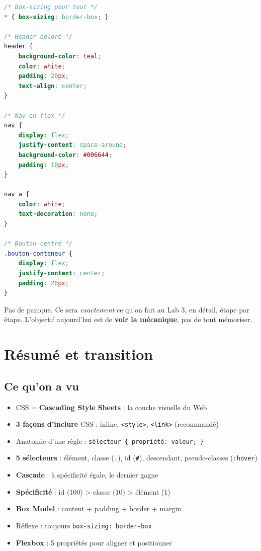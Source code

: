 \documentclass[11pt,a4paper]{article}
\begin{document}
\begin{lstlisting}[language=CSS]
/* Box-sizing pour tout */
* { box-sizing: border-box; }

/* Header coloré */
header {
    background-color: teal;
    color: white;
    padding: 20px;
    text-align: center;
}

/* Nav en flex */
nav {
    display: flex;
    justify-content: space-around;
    background-color: #006644;
    padding: 10px;
}

nav a {
    color: white;
    text-decoration: none;
}

/* Bouton centré */
.bouton-conteneur {
    display: flex;
    justify-content: center;
    padding: 20px;
}
\end{lstlisting}

\begin{infobox}
Pas de panique. Ce sera \emph{exactement} ce qu'on fait au Lab 3, en
détail, étape par étape. L'objectif aujourd'hui est de \textbf{voir la
mécanique}, pas de tout mémoriser.
\end{infobox}

\newpage

\section{Résumé et transition}

\subsection{Ce qu'on a vu}

\begin{itemize}[leftmargin=*,nosep]
    \item CSS = \textbf{Cascading Style Sheets} : la couche visuelle du Web
    \item \textbf{3 façons d'inclure} CSS : inline, \texttt{<style>}, \texttt{<link>} (recommandé)
    \item Anatomie d'une règle : \texttt{sélecteur \{ propriété: valeur; \}}
    \item \textbf{5 sélecteurs} : élément, classe (\texttt{.}), id (\texttt{\#}), descendant, pseudo-classes (\texttt{:hover})
    \item \textbf{Cascade} : à spécificité égale, le dernier gagne
    \item \textbf{Spécificité} : id (100) > classe (10) > élément (1)
    \item \textbf{Box Model} : content + padding + border + margin
    \item Réflexe : toujours \texttt{box-sizing: border-box}
    \item \textbf{Flexbox} : 5 propriétés pour aligner et positionner
\end{itemize}
\end{document}
